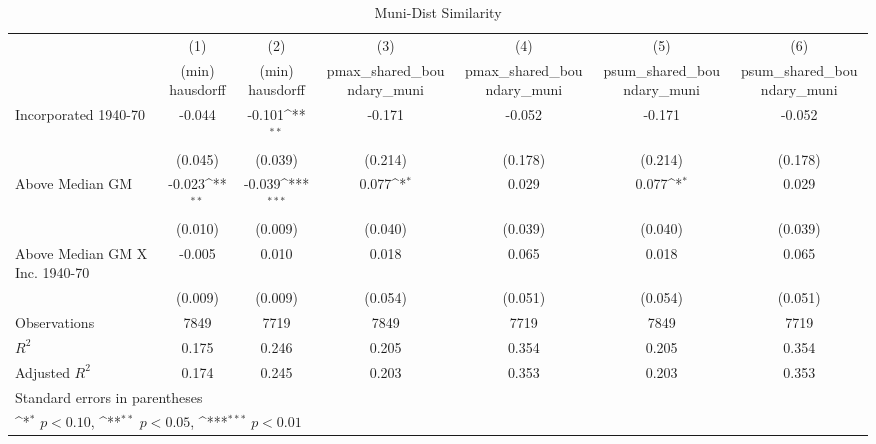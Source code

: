 \begin{table}[htbp]\centering
\def\sym#1{\ifmmode^{#1}\else\(^{#1}\)\fi}
\caption{Muni-Dist Similarity}
\begin{tabular}{l*{6}{c}}
\hline\hline
                    &\multicolumn{1}{c}{(1)}&\multicolumn{1}{c}{(2)}&\multicolumn{1}{c}{(3)}&\multicolumn{1}{c}{(4)}&\multicolumn{1}{c}{(5)}&\multicolumn{1}{c}{(6)}\\
                    &\multicolumn{1}{c}{(min) hausdorff}&\multicolumn{1}{c}{(min) hausdorff}&\multicolumn{1}{c}{pmax\_shared\_boundary\_muni}&\multicolumn{1}{c}{pmax\_shared\_boundary\_muni}&\multicolumn{1}{c}{psum\_shared\_boundary\_muni}&\multicolumn{1}{c}{psum\_shared\_boundary\_muni}\\
\hline
Incorporated 1940-70&      -0.044         &      -0.101\sym{**} &      -0.171         &      -0.052         &      -0.171         &      -0.052         \\
                    &     (0.045)         &     (0.039)         &     (0.214)         &     (0.178)         &     (0.214)         &     (0.178)         \\
[1em]
Above Median GM     &      -0.023\sym{**} &      -0.039\sym{***}&       0.077\sym{*}  &       0.029         &       0.077\sym{*}  &       0.029         \\
                    &     (0.010)         &     (0.009)         &     (0.040)         &     (0.039)         &     (0.040)         &     (0.039)         \\
[1em]
Above Median GM X Inc. 1940-70&      -0.005         &       0.010         &       0.018         &       0.065         &       0.018         &       0.065         \\
                    &     (0.009)         &     (0.009)         &     (0.054)         &     (0.051)         &     (0.054)         &     (0.051)         \\
\hline
Observations        &        7849         &        7719         &        7849         &        7719         &        7849         &        7719         \\
\(R^{2}\)           &       0.175         &       0.246         &       0.205         &       0.354         &       0.205         &       0.354         \\
Adjusted \(R^{2}\)  &       0.174         &       0.245         &       0.203         &       0.353         &       0.203         &       0.353         \\
\hline\hline
\multicolumn{7}{l}{\footnotesize Standard errors in parentheses}\\
\multicolumn{7}{l}{\footnotesize \sym{*} \(p<0.10\), \sym{**} \(p<0.05\), \sym{***} \(p<0.01\)}\\
\end{tabular}
\end{table}
